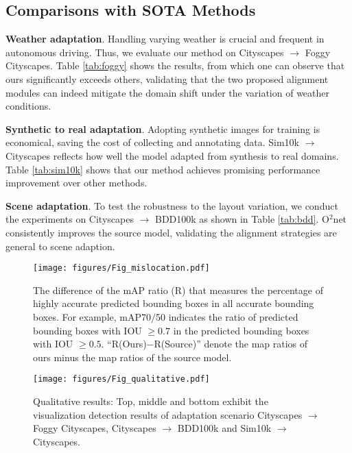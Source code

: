 \documentclass[sigconf]{acmart}
\begin{document}
\subsection{Comparisons with SOTA Methods}

\textbf{Weather adaptation}. Handling varying weather is crucial and frequent in autonomous driving. Thus, we evaluate our method on Cityscapes $\rightarrow$ Foggy Cityscapes. Table \ref{tab:foggy} shows the results, from which one can observe that ours significantly exceeds others, validating that the two proposed alignment modules can indeed mitigate the domain shift under the variation of weather conditions.

\textbf{Synthetic to real adaptation}. Adopting synthetic images for training is economical, saving the cost of collecting and annotating data. Sim10k $\rightarrow$ Cityscapes reflects how well the model adapted from synthesis to real domains. Table \ref{tab:sim10k} shows that our method achieves promising performance improvement over other methods.

\textbf{Scene adaptation}. To test the robustness to the layout variation, we conduct the experiments on Cityscapes $\rightarrow$ BDD100k as shown in Table \ref{tab:bdd}. O$^2$net consistently improves the source model, validating the alignment strategies are general to scene adaption.


\begin{figure}[t]
    \centerline{\texttt{[image: figures/Fig\_mislocation.pdf]}}
    \vspace{-2mm}
    \caption{The difference of the mAP ratio (R) that measures the percentage of highly accurate predicted bounding boxes in all accurate bounding boxes. For example, mAP70$/$50 indicates the ratio of predicted bounding boxes with IOU $\geq 0.7$ in the predicted bounding boxes with IOU $\geq 0.5$. ``R(Ours)$-$R(Source)'' denote the map ratios of ours minus the map ratios of the source model.}
    \label{fig:fig_mislocation}
    \vspace{-4mm}
\end{figure}


\begin{figure*}[t]
    \centerline{\texttt{[image: figures/Fig\_qualitative.pdf]}}
    \caption{Qualitative results: Top, middle and bottom exhibit the visualization detection results of adaptation scenario Cityscapes $\rightarrow$ Foggy Cityscapes, Cityscapes $\rightarrow$ BDD100k and Sim10k $\rightarrow$ Cityscapes.}
    \label{fig:fig_qualitative}
    \vspace{-4mm}
\end{figure*}
\end{document}
